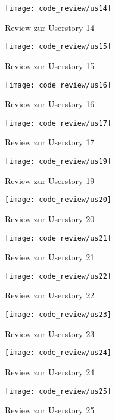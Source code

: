 \begin{figure}[H]
\centering
\texttt{[image: code\_review/us14]}
\caption{Review zur Userstory 14}
\end{figure}

\begin{figure}[H]
\centering
\texttt{[image: code\_review/us15]}
\caption{Review zur Userstory 15}
\end{figure}

\begin{figure}[H]
\centering
\texttt{[image: code\_review/us16]}
\caption{Review zur Userstory 16}
\end{figure}

\begin{figure}[H]
\centering
\texttt{[image: code\_review/us17]}
\caption{Review zur Userstory 17}
\end{figure}

\begin{figure}[H]
\centering
\texttt{[image: code\_review/us19]}
\caption{Review zur Userstory 19}
\end{figure}

\begin{figure}[H]
\centering
\texttt{[image: code\_review/us20]}
\caption{Review zur Userstory 20}
\end{figure}

\begin{figure}[H]
\centering
\texttt{[image: code\_review/us21]}
\caption{Review zur Userstory 21}
\end{figure}

\begin{figure}[H]
\centering
\texttt{[image: code\_review/us22]}
\caption{Review zur Userstory 22}
\end{figure}

\begin{figure}[H]
\centering
\texttt{[image: code\_review/us23]}
\caption{Review zur Userstory 23}
\end{figure}

\begin{figure}[H]
\centering
\texttt{[image: code\_review/us24]}
\caption{Review zur Userstory 24}
\end{figure}

\begin{figure}[H]
\centering
\texttt{[image: code\_review/us25]}
\caption{Review zur Userstory 25}
\end{figure}

